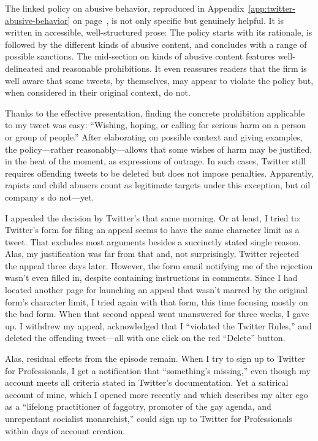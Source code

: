 \noindent{}The linked policy on abusive behavior, reproduced in
Appendix~\ref{app:twitter-abusive-behavior} on
page~\pageref{app:twitter-abusive-behavior}, is not only specific but genuinely
helpful. It is written in accessible, well-structured prose: The policy starts
with its rationale, is followed by the different kinds of abusive content, and
concludes with a range of possible sanctions. The mid-section on kinds of
abusive content features well-delineated and reasonable prohibitions. It even
reassures readers that the firm is well aware that some tweets, by themselves,
may appear to violate the policy but, when considered in their original context,
do not.

Thanks to the effective presentation, finding the concrete prohibition
applicable to my tweet was easy: ``Wishing, hoping, or calling for serious harm
on a person or group of people.'' After elaborating on possible context and
giving examples, the policy---rather reasonably---allows that some wishes of
harm may be justified, in the heat of the moment, as expressions of outrage. In
such cases, Twitter still requires offending tweets to be deleted but does not
impose penalties. Apparently, rapists and child abusers count as legitimate
targets under this exception, but oil company s do not---yet.

I appealed the decision by Twitter's  that same morning. Or at least, I
tried to: Twitter's form for filing an appeal seems to have the same character
limit as a tweet. That excludes most arguments besides a succinctly stated
single reason. Alas, my justification was far from that and, not surprisingly,
Twitter rejected the appeal three days later. However, the form email notifying
me of the rejection wasn't even filled in, despite containing instructions in
 comments. Since I had located another page for launching an appeal that
wasn't marred by the original form's character limit, I tried again with that
form, this time focusing mostly on the bad form. When that second appeal went
unanswered for three weeks, I gave up. I withdrew my appeal, acknowledged that I
``violated the Twitter Rules,'' and deleted the offending tweet---all with one
click on the red ``Delete'' button.

Alas, residual effects from the episode remain. When I try to sign up to Twitter
for Professionals, I get a notification that ``something's missing,'' even
though my account meets all criteria stated in Twitter's documentation. Yet a
satirical account of mine, which I opened more recently and which describes my
alter ego as a ``lifelong practitioner of faggotry, promoter of the gay agenda,
and unrepentant socialist monarchist,'' could sign up to Twitter for
Professionals within days of account creation.


